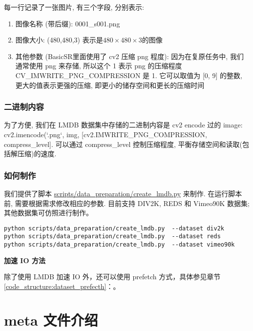 \documentclass[../main.tex]{subfiles}
\begin{document}
每一行记录了一张图片, 有三个字段, 分别表示:
\begin{enumerate}
    \item 图像名称 (带后缀): 0001\_s001.png
    \item 图像大小: (480,480,3) 表示是$480\times480\times3$的图像
    \item 其他参数 (BasicSR里面使用了 cv2 压缩 png 程度): 因为在复原任务中, 我们通常使用 png 来存储, 所以这个 1 表示 png 的压缩程度
          CV\_IMWRITE\_PNG\_COMPRESSION 是 1. 它可以取值为 [0, 9] 的整数, 更大的值表示更强的压缩, 即更小的储存空间和更长的压缩时间
\end{enumerate}

\subsubsection{二进制内容}

为了方便, 我们在 LMDB 数据集中存储的二进制内容是 cv2 encode 过的 image: cv2.imencode(`.png`, img, [cv2.IMWRITE\_PNG\_COMPRESSION, compress\_level]. 可以通过 compress\_level 控制压缩程度, 平衡存储空间和读取(包括解压缩)的速度.

\subsubsection{如何制作}

我们提供了脚本 \href{https://github.com/XPixelGroup/BasicSR/blob/master/scripts/data_preparation/create_lmdb.py}{scripts/data\_preparation/create\_lmdb.py} 来制作. 在运行脚本前, 需要根据需求修改相应的参数. 目前支持 DIV2K, REDS 和 Vimeo90K 数据集; 其他数据集可仿照进行制作。

\begin{verbatim}
python scripts/data_preparation/create_lmdb.py  --dataset div2k
python scripts/data_preparation/create_lmdb.py  --dataset reds
python scripts/data_preparation/create_lmdb.py  --dataset vimeo90k
\end{verbatim}

\begin{note} %
    \textbf{加速 IO 方法}

    除了使用 LMDB 加速 IO 外，还可以使用 prefetch 方式，具体参见章节\ref{code_structure:dataset_prefecth}：。
\end{note}

\section{meta 文件介绍}\label{data_preparation:meta_file}
\end{document}
